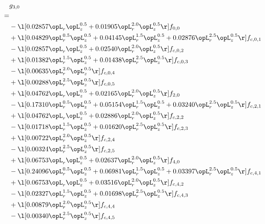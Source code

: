 \begin{alignat}{2} 
\label{eq:g_30_0} 
& g_{3,0} \nonumber \\ 
 = \\ 
& - \l[  0.02857 \opL_r \opL_z^{0.5} +  0.01905 \opL_r^{2.0} \opL_z^{0.5}  \r] f_{0,0} \nonumber \\ 
& + \l[  0.04829 \opL_r^{0.5} \opL_z^{0.5} +  0.04145 \opL_r^{1.5} \opL_z^{0.5} +  0.02876 \opL_r^{2.5} \opL_z^{0.5}  \r] f_{c,0,1} \nonumber \\ 
& - \l[  0.02857 \opL_r \opL_z^{0.5} +  0.02540 \opL_r^{2.0} \opL_z^{0.5}  \r] f_{c,0,2} \nonumber \\ 
& + \l[  0.01382 \opL_r^{1.5} \opL_z^{0.5} +  0.01438 \opL_r^{2.5} \opL_z^{0.5}  \r] f_{c,0,3} \nonumber \\ 
& - \l[  0.00635 \opL_r^{2.0} \opL_z^{0.5}  \r] f_{c,0,4} \nonumber \\ 
& + \l[  0.00288 \opL_r^{2.5} \opL_z^{0.5}  \r] f_{c,0,5} \nonumber \\ 
& + \l[  0.04762 \opL_r \opL_z^{0.5} +  0.02165 \opL_r^{2.0} \opL_z^{0.5}  \r] f_{2,0} \nonumber \\ 
& - \l[  0.17310 \opL_r^{0.5} \opL_z^{0.5} +  0.05154 \opL_r^{1.5} \opL_z^{0.5} +  0.03240 \opL_r^{2.5} \opL_z^{0.5}  \r] f_{c,2,1} \nonumber \\ 
& + \l[  0.04762 \opL_r \opL_z^{0.5} +  0.02886 \opL_r^{2.0} \opL_z^{0.5}  \r] f_{c,2,2} \nonumber \\ 
& - \l[  0.01718 \opL_r^{1.5} \opL_z^{0.5} +  0.01620 \opL_r^{2.5} \opL_z^{0.5}  \r] f_{c,2,3} \nonumber \\ 
& + \l[  0.00722 \opL_r^{2.0} \opL_z^{0.5}  \r] f_{c,2,4} \nonumber \\ 
& - \l[  0.00324 \opL_r^{2.5} \opL_z^{0.5}  \r] f_{c,2,5} \nonumber \\ 
& + \l[  0.06753 \opL_r \opL_z^{0.5} +  0.02637 \opL_r^{2.0} \opL_z^{0.5}  \r] f_{4,0} \nonumber \\ 
& - \l[  0.24096 \opL_r^{0.5} \opL_z^{0.5} +  0.06981 \opL_r^{1.5} \opL_z^{0.5} +  0.03397 \opL_r^{2.5} \opL_z^{0.5}  \r] f_{c,4,1} \nonumber \\ 
& + \l[  0.06753 \opL_r \opL_z^{0.5} +  0.03516 \opL_r^{2.0} \opL_z^{0.5}  \r] f_{c,4,2} \nonumber \\ 
& - \l[  0.02327 \opL_r^{1.5} \opL_z^{0.5} +  0.01698 \opL_r^{2.5} \opL_z^{0.5}  \r] f_{c,4,3} \nonumber \\ 
& + \l[  0.00879 \opL_r^{2.0} \opL_z^{0.5}  \r] f_{c,4,4} \nonumber \\ 
& - \l[  0.00340 \opL_r^{2.5} \opL_z^{0.5}  \r] f_{c,4,5} \nonumber \\ 
\end{alignat} 


